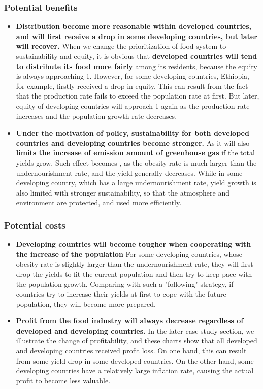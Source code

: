 \documentclass[12pt]{article}
\begin{document}
\subsubsection{Potential benefits}

\begin{itemize}
    \item \textbf{Distribution become more reasonable within developed countries, and will first receive a drop in some developing countries, but later will recover.} When we change the prioritization of food system to sustainability and equity, it is obvious that \textbf{ developed countries will tend to distribute its food more fairly} among its residents, because the equity is always approaching 1. However, for some developing countries, Ethiopia, for example, firstly received a drop in equity. This can result from the fact that the production rate fails to exceed the population rate at first. But later, equity of developing countries will approach 1 again as the production rate increases and the population growth rate decreases.
    \item \textbf{Under the motivation of policy, sustainability for both developed countries and developing countries become stronger.} As it will also \textbf{limits the increase of emission amount of greenhouse gas} if the total yields grow. Such effect becomes , as the obesity rate is much larger than the undernourishment rate, and the yield generally decreases. While in some developing country, which has a large undernourishment rate, yield growth is also limited with stronger sustainability, so that the atmosphere and environment are protected, and used more efficiently.
\end{itemize}

\subsubsection{Potential costs}
\begin{itemize}
    \item \textbf{Developing countries will become tougher when cooperating with the increase of the population} For some developing countries, whose obesity rate is slightly larger than the undernourishment rate, they will first drop the yields to fit the current population and then try to keep pace with the population growth. Comparing with such a "following" strategy, if countries try to increase their yields at first to cope with the future population, they will become more prepared.
    
    \item \textbf{Profit from the food industry will always decrease regardless of developed and developing countries.} In the later case study section, we illustrate the change of profitability, and these charts show that all developed and developing countries received profit loss. On one hand, this can result from some yield drop in some developed countries. On the other hand, some developing countries have a relatively large inflation rate, causing the actual profit to become less valuable. 
\end{itemize}
\end{document}
